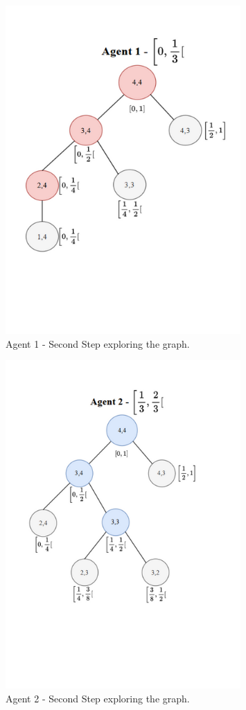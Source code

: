 \begin{figure}[H]
    \centering
    \includegraphics[width=0.8\textwidth]{ApeA/maze_agent_1_step_2.png}
    \caption{Agent 1 - Second Step exploring the graph.}
    \label{fig_agent_1_step_2}
\end{figure}

\begin{figure}[H]
    \centering
    \includegraphics[width=0.8\textwidth]{ApeA/maze_agent_2_step_2.png}
    \caption{Agent 2 - Second Step exploring the graph.}
    \label{fig_agent_2_step_2}
\end{figure}

